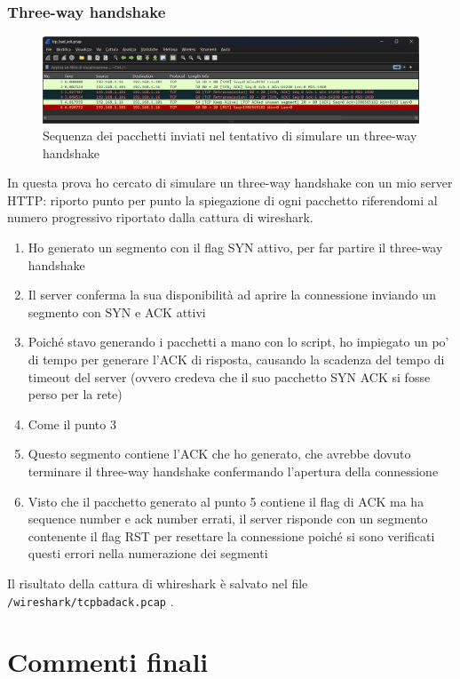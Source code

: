 \documentclass[12pt,a4paper]{report}
\begin{document}
\subsection{Three-way handshake}
\begin{figure}[H]
	\centering
	\includegraphics[width=1\textwidth]{tcp_bad_ack_packets}
 	\caption{Sequenza dei pacchetti inviati nel tentativo di simulare un three-way handshake}
	\label{tcp_bad_ack}
\end{figure}
In questa prova ho cercato di simulare un three-way handshake con un mio server HTTP: riporto punto per punto la spiegazione di ogni pacchetto riferendomi al numero progressivo riportato dalla cattura di wireshark.
\begin{enumerate}
	\item Ho generato un segmento con il flag SYN attivo, per far partire il three-way handshake
	\item Il server conferma la sua disponibilità ad aprire la connessione inviando un segmento con SYN e ACK attivi
	\item Poiché stavo generando i pacchetti a mano con lo script, ho impiegato un po' di tempo per generare l'ACK di risposta, causando la scadenza del tempo di timeout del server (ovvero credeva che il suo pacchetto SYN ACK si fosse perso per la rete)
	\item Come il punto 3
	\item Questo segmento contiene l'ACK che ho generato, che avrebbe dovuto terminare il three-way handshake confermando l'apertura della connessione
	\item Visto che il pacchetto generato al punto 5 contiene il flag di ACK ma ha sequence number e ack number errati, il server risponde con un segmento contenente il flag RST per resettare la connessione poiché si sono verificati questi errori nella numerazione dei segmenti
\end{enumerate}
Il risultato della cattura di whireshark è salvato nel file \texttt{/wireshark/tcp{\textunderscore}bad{\textunderscore}ack.pcap} .

\chapter{Commenti finali}
\end{document}
